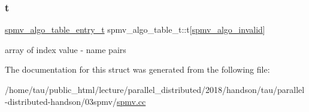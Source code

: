 \subsubsection{\texorpdfstring{t}{t}}
{\footnotesize\ttfamily \hyperlink{structspmv__algo__table__entry__t}{spmv\+\_\+algo\+\_\+table\+\_\+entry\+\_\+t} spmv\+\_\+algo\+\_\+table\+\_\+t\+::t\mbox{[}\hyperlink{spmv_8cc_ad2cf0493af54bf76c5be68b4634fcab7add2a1e0329d677ee5f5fcc7ee8077dd0}{spmv\+\_\+algo\+\_\+invalid}\mbox{]}}

array of index value -\/ name pairs 

The documentation for this struct was generated from the following file\+:\begin{DoxyCompactItemize}
\item 
/home/tau/public\+\_\+html/lecture/parallel\+\_\+distributed/2018/handson/tau/parallel-\/distributed-\/handson/03spmv/\hyperlink{spmv_8cc}{spmv.\+cc}\end{DoxyCompactItemize}
